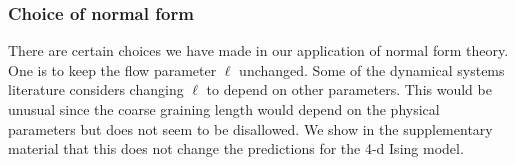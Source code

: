 \documentclass[
 reprint,
 amsmath,amssymb,
 aps, superscriptaddress, pre
]{revtex4-1}
\begin{document}


\subsubsection{Choice of normal form} 

There are certain choices we have made in our application of normal form theory. One is to keep the flow parameter $\ell$ unchanged. Some of the dynamical systems literature considers changing $\ell$ to depend on other parameters. This would be unusual since the coarse graining length would depend on the physical parameters but does not seem to be disallowed. %
We show in the supplementary material that this does not change the predictions for the 4-d Ising model.
\end{document}
